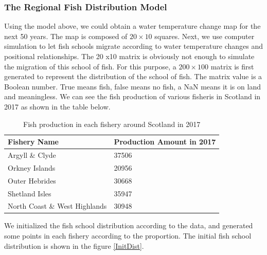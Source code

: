 \documentclass{mcmthesis}
\numberwithin{figure}{section}
\numberwithin{table}{section}
\begin{document}
\subsubsection{The Regional Fish Distribution Model}

Using the model above, we could obtain a water temperature change map for the next 50 years. The map is composed of $20 \times 10$ squares. Next, we use computer simulation to let fish schools migrate according to water temperature changes and positional relationships. The 20 x10 matrix is obviously not enough to simulate the migration of this school of fish. For this purpose, a $200 \times 100$ matrix is first generated to represent the distribution of the school of fish. The matrix value is a Boolean number. True means fish, false means no fish, a NaN means it is on land and meaningless. We can see the fish production of various fisheris in Scotland in 2017 as shown in the table below.

\begin{table}[H]
  \centering
  \begin{tabular}{|l|l|}%
  \hline  %
  \textbf{Fishery Name}&\textbf{Production Amount in 2017}\\
  \hline  %
  Argyll \& Clyde & 37506\\
  \hline %
  Orkney Islands & 20956\\
  \hline %
  Outer Hebrides  & 30668\\
  \hline %
  Shetland Isles & 35947\\
  \hline %
  North Coast \& West Highlands & 30948\\
  \hline %
  \end{tabular}
  \caption{Fish production in each fishery around Scotland in 2017}
  \label{FisheryAmount}
  \end{table}

We initialized the fish school distribution according to the data, and generated some points in each fishery according to the proportion. The initial fish school distribution is shown in the figure \ref{InitDist}.
\end{document}
